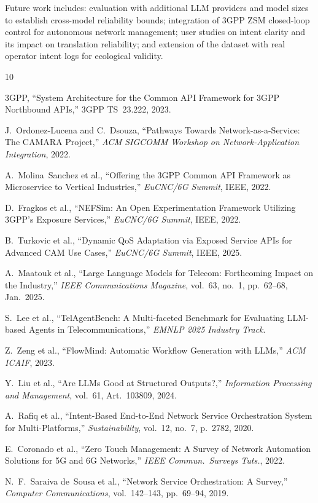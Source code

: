 \documentclass[conference]{IEEEtran}
\begin{document}
Future work includes: evaluation with additional LLM providers and model
sizes to establish cross-model reliability bounds; integration of 3GPP ZSM
closed-loop control for autonomous network management; user studies on
intent clarity and its impact on translation reliability; and extension of
the dataset with real operator intent logs for ecological validity.

\begin{thebibliography}{10}

3GPP, ``System Architecture for the Common API Framework for 3GPP Northbound
APIs,'' 3GPP TS~23.222, 2023.

J.~Ordonez-Lucena and C.~Dsouza, ``Pathways Towards Network-as-a-Service:
The CAMARA Project,'' \emph{ACM SIGCOMM Workshop on Network-Application
Integration}, 2022.

A.~Molina~Sanchez et al., ``Offering the 3GPP Common API Framework as
Microservice to Vertical Industries,'' \emph{EuCNC/6G Summit}, IEEE, 2022.

D.~Fragkos et al., ``NEFSim: An Open Experimentation Framework Utilizing
3GPP's Exposure Services,'' \emph{EuCNC/6G Summit}, IEEE, 2022.

B.~Turkovic et al., ``Dynamic QoS Adaptation via Exposed Service APIs for
Advanced CAM Use Cases,'' \emph{EuCNC/6G Summit}, IEEE, 2025.

A.~Maatouk et al., ``Large Language Models for Telecom: Forthcoming Impact
on the Industry,'' \emph{IEEE Communications Magazine}, vol.~63, no.~1,
pp.~62--68, Jan.\ 2025.

S.~Lee et al., ``TelAgentBench: A Multi-faceted Benchmark for Evaluating
LLM-based Agents in Telecommunications,'' \emph{EMNLP 2025 Industry Track}.

Z.~Zeng et al., ``FlowMind: Automatic Workflow Generation with LLMs,''
\emph{ACM ICAIF}, 2023.

Y.~Liu et al., ``Are LLMs Good at Structured Outputs?,''
\emph{Information Processing and Management}, vol.~61, Art.~103809, 2024.

A.~Rafiq et al., ``Intent-Based End-to-End Network Service Orchestration
System for Multi-Platforms,'' \emph{Sustainability}, vol.~12, no.~7,
p.~2782, 2020.

E.~Coronado et al., ``Zero Touch Management: A Survey of Network Automation
Solutions for 5G and 6G Networks,''
\emph{IEEE Commun.\ Surveys Tuts.}, 2022.

N.~F.~Saraiva de~Sousa et al., ``Network Service Orchestration: A Survey,''
\emph{Computer Communications}, vol.~142--143, pp.~69--94, 2019.

\end{thebibliography}
\end{document}
